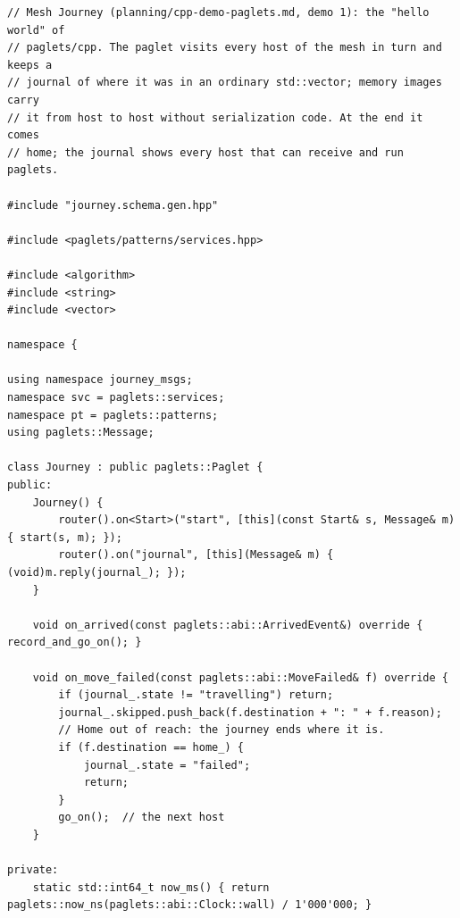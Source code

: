 \begin{lstlisting}[style=paglets-cpp,caption={The Mesh Journey \src{cpp/examples/journey/journey.cpp}},label={lst:app-journey}]
// Mesh Journey (planning/cpp-demo-paglets.md, demo 1): the "hello world" of
// paglets/cpp. The paglet visits every host of the mesh in turn and keeps a
// journal of where it was in an ordinary std::vector; memory images carry
// it from host to host without serialization code. At the end it comes
// home; the journal shows every host that can receive and run paglets.

#include "journey.schema.gen.hpp"

#include <paglets/patterns/services.hpp>

#include <algorithm>
#include <string>
#include <vector>

namespace {

using namespace journey_msgs;
namespace svc = paglets::services;
namespace pt = paglets::patterns;
using paglets::Message;

class Journey : public paglets::Paglet {
public:
    Journey() {
        router().on<Start>("start", [this](const Start& s, Message& m) { start(s, m); });
        router().on("journal", [this](Message& m) { (void)m.reply(journal_); });
    }

    void on_arrived(const paglets::abi::ArrivedEvent&) override { record_and_go_on(); }

    void on_move_failed(const paglets::abi::MoveFailed& f) override {
        if (journal_.state != "travelling") return;
        journal_.skipped.push_back(f.destination + ": " + f.reason);
        // Home out of reach: the journey ends where it is.
        if (f.destination == home_) {
            journal_.state = "failed";
            return;
        }
        go_on();  // the next host
    }

private:
    static std::int64_t now_ms() { return paglets::now_ns(paglets::abi::Clock::wall) / 1'000'000; }


\end{lstlisting}
